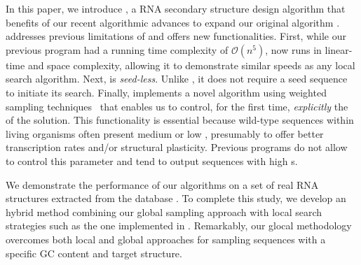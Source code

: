 In this paper, we introduce \ourprog, a RNA secondary structure design algorithm that benefits of our recent algorithmic advances \cite{Reinharz:2013aa} to expand our original \RNAensign algorithm \cite{Levin:2012kx}. \ourprog addresses previous limitations of \RNAensign and offers new functionalities. First, while our previous program had a running time complexity of $\mathcal{O}(n^5)$, \ourprog now runs in linear-time and space complexity, allowing it to demonstrate similar speeds as any local search algorithm. Next, \ourprog is \textit{seed-less}. Unlike \RNAensign, it does not require a seed sequence to initiate its search. Finally, \ourprog implements a novel algorithm using weighted sampling techniques~\cite{Bodini2010} that enables us to control, for the first time, \textit{explicitly} the \GCContent of the solution. This functionality is essential because wild-type sequences within living organisms often present medium or low \GCContent, presumably to offer better transcription rates and/or structural plasticity. Previous programs do not allow to control this parameter and tend to output sequences with high \GCContent{}s. 

We demonstrate the performance of our algorithms on a set of real RNA structures extracted from the \RNASTRAND database \cite{andronescu2008rna}. To complete this study, we develop an hybrid method combining our global sampling approach with local search strategies such as the one implemented in \RNAinverse.  Remarkably, our glocal methodology overcomes both local and global approaches  for sampling sequences with a specific GC content and target structure.